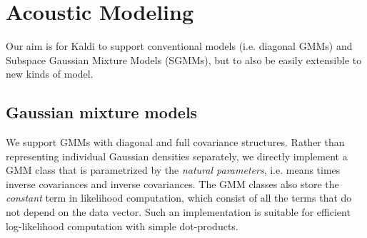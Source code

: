 \documentclass[10pt,conference,letterpaper]{IEEEtran}
\def \st {\small \tt}
\begin{document}



\section{Acoustic Modeling}
\label{sec:am}
Our aim is for Kaldi to support conventional models (i.e. diagonal GMMs) and 
Subspace Gaussian Mixture Models (SGMMs), but to also be easily extensible to 
new kinds of model. 

\subsection{Gaussian mixture models}
We support GMMs with diagonal and full covariance structures. Rather than 
representing individual Gaussian densities separately, we directly implement a 
GMM class that is parametrized by the {\em natural parameters}, i.e. means 
times inverse covariances and inverse covariances. The GMM classes also store 
the {\em constant} term in likelihood computation, which consist of all the 
terms that do not depend on the data vector. 
Such an implementation is suitable for efficient log-likelihood computation 
with simple dot-products. 
\end{document}
